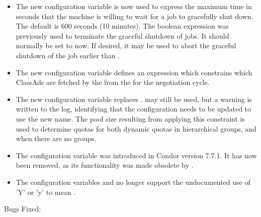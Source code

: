 \begin{itemize}

\item The new configuration variable  is
now used to express the maximum time in seconds that the machine is
willing to wait for a job to gracefully shut down.  
The default is 600 seconds (10 minutes).  
The boolean  expression was
previously used to terminate the graceful shutdown of jobs.  
It should normally be set to  now.  If desired, it may be
used to abort the graceful shutdown of the job earlier than
.

\item The new configuration variable  
defines an expression which constrains which ClassAds are fetched
by the  from the 
for the negotiation cycle. 

\item The new configuration variable 
replaces .
 may still be used,
but a warning is written to the log,
identifying that the configuration needs to be updated to use the new name.
The pool size resulting from applying this constraint is used
to determine quotas for both dynamic quotas in hierarchical groups,
and when there are no groups.

\item The configuration variable  
was introduced in Condor version 7.7.1.
It has now been removed, as its functionality 
was made obsolete by .

\item The configuration variables 
and  no longer support the undocumented use of
'Y' or 'y' to mean .

\end{itemize}

\noindent Bugs Fixed:

